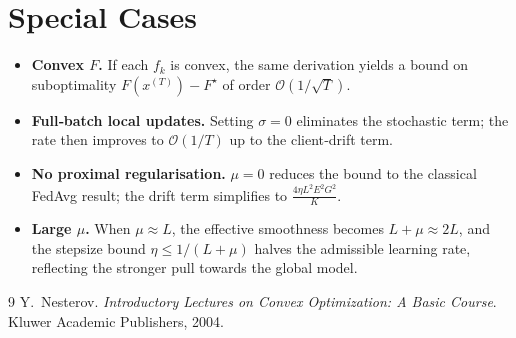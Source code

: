\documentclass[11pt]{article}
\begin{document}
\section*{Special Cases}
\begin{itemize}
\item \textbf{Convex $F$.} If each $f_k$ is convex, the same derivation yields a bound on suboptimality $F(x^{(T)})-F^\star$ of order $\mathcal{O}(1/\sqrt{T})$.
\item \textbf{Full‑batch local updates.} Setting $\sigma=0$ eliminates the stochastic term; the rate then improves to $\mathcal{O}(1/T)$ up to the client‑drift term.
\item \textbf{No proximal regularisation.} $\mu=0$ reduces the bound to the classical FedAvg result; the drift term simplifies to $\frac{4\eta L^2E^2 G^2}{K}$.
\item \textbf{Large $\mu$.} When $\mu\approx L$, the effective smoothness becomes $L+\mu\approx 2L$, and the stepsize bound $\eta\le 1/(L+\mu)$ halves the admissible learning rate, reflecting the stronger pull towards the global model.
\end{itemize}

\begin{thebibliography}{9}
Y.~Nesterov.
\newblock \emph{Introductory Lectures on Convex Optimization: A Basic Course}.
\newblock Kluwer Academic Publishers, 2004.
\end{thebibliography}
\end{document}
